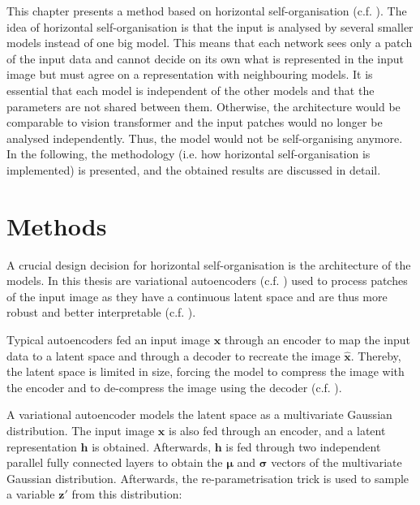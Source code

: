 This chapter presents a method based on horizontal self-organisation (c.f. ).
The idea of horizontal self-organisation is that the input is analysed by several smaller models instead of one big model.
This means that each network sees only a patch of the input data and cannot decide on its own what is represented in the input image but must agree on a representation with neighbouring models.
It is essential that each model is independent of the other models and that the parameters are not shared between them. Otherwise, the architecture would be comparable to vision transformer  and the input patches would no longer be analysed independently. Thus, the model would not be self-organising anymore. In the following, the methodology (i.e. how horizontal self-organisation is implemented) is presented, and the obtained results are discussed in detail.

\section{Methods}
A crucial design decision for horizontal self-organisation is the architecture of the models.
In this thesis are variational autoencoders  (c.f. ) used to process patches of the input image as they have a continuous latent space and are thus more robust and better interpretable (c.f. ).

Typical autoencoders fed an input image $\boldsymbol{x}$ through an encoder to map the input data to a latent space and through a decoder to recreate the image $\boldsymbol{\hat{x}}$. Thereby, the latent space is limited in size, forcing the model to compress the image with the encoder and to de-compress the image using the decoder (c.f. ).

A variational autoencoder models the latent space as a multivariate Gaussian distribution. The input image $\boldsymbol{x}$ is also fed through an encoder, and a latent representation $\boldsymbol{h}$ is obtained. Afterwards, $\boldsymbol{h}$ is fed through two independent parallel fully connected layers to obtain the $\boldsymbol{\mu}$ and $\boldsymbol{\sigma}$ vectors of the multivariate Gaussian distribution. Afterwards, the re-parametrisation trick is used to sample a variable $\boldsymbol{z}'$ from this distribution:

